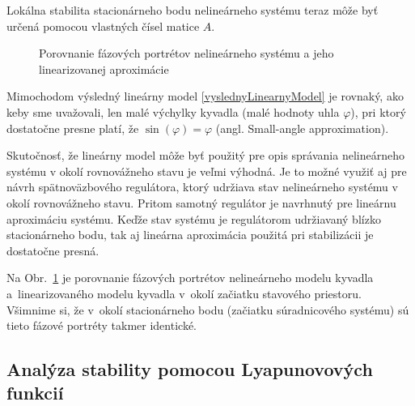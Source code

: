 \documentclass[a4paper, 10pt, ]{article}
\begin{document}
Lokálna stabilita stacionárneho bodu nelineárneho systému teraz môže byť určená pomocou vlastných čísel matice $A$.






\begin{figure}[!t]
	\centering

	\caption{Porovnanie fázových portrétov nelineárneho systému a jeho linearizovanej aproximácie}
	\label{Porovnaniefazpor}
\end{figure}





Mimochodom výsledný lineárny model \eqref{vyslednyLinearnyModel} je rovnaký, ako keby sme uvažovali, len malé výchylky kyvadla (malé hodnoty uhla $\varphi$), pri ktorý dostatočne presne platí, že $\sin(\varphi) = \varphi$ (angl. Small-angle approximation).

Skutočnosť, že lineárny model môže byť použitý pre opis správania nelineárneho systému v okolí rovnovážneho stavu je veľmi výhodná. Je to možné využiť aj pre návrh spätnoväzbového regulátora, ktorý udržiava stav nelineárneho systému v okolí rovnovážneho stavu. Pritom samotný regulátor je navrhnutý pre lineárnu aproximáciu systému. Keďže stav systému je regulátorom udržiavaný blízko stacionárneho bodu, tak aj lineárna aproximácia použitá pri stabilizácii je dostatočne presná.

Na Obr.~\ref{Porovnaniefazpor} je porovnanie fázových portrétov nelineárneho modelu kyvadla a~linearizovaného modelu kyvadla v~okolí začiatku stavového priestoru. Všimnime si, že v~okolí stacionárneho bodu (začiatku súradnicového systému) sú tieto fázové portréty takmer identické.









\subsection{Analýza stability pomocou Lyapunovových funkcií}
\end{document}
